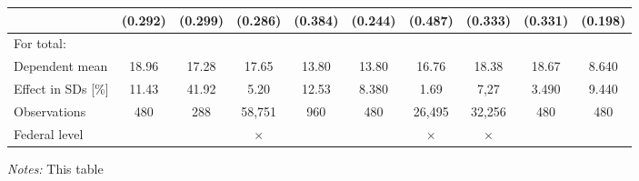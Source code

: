 \begin{landscape}
\begin{table}[htbp]
\begin{threeparttable}
{\begin{tabular}{l*{9}{c}}
										&	(0.292)			&	(0.299)			&   (0.286)     	&	(0.384)			& 	(0.244)			&	(0.487)		&	(0.333)				&	 (0.331) 		&	(0.198)		\\
					\midrule            																																																			
					For total: 																																															\\							 
					Dependent mean 		&   18.96			&	17.28			&   17.65     		&	13.80			& 	13.80			&	16.76		&	18.38				&	18.67			&	8.640		\\
					Effect in SDs [\%] 	&   11.43			&	41.92			&   5.20      		&	12.53			& 	8.380			&	1.69		&	7,27				&	3.490			&	9.440		\\
					Observations 		&   480				&	288				&   58,751    		&	960				& 	480				&	26,495		&	32,256				&	480				&	480			\\
					Federal level		&   \checkmark		&	\checkmark		&   $\times$		& \checkmark		&	\checkmark		&	$\times$	&	$\times$			&	\checkmark		&  \checkmark	\\ 
					\bottomrule
			\end{tabular}}
	\end{threeparttable} 
		\begin{minipage}{0.9\linewidth}
		\scriptsize \emph{Notes:} This table %
	\end{minipage}
\end{table} 
	\vspace*{\fill}\clearpage
\end{landscape}

